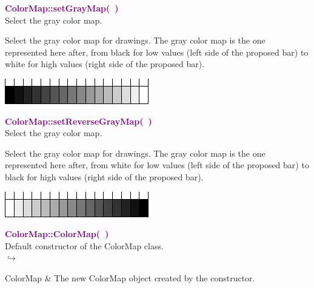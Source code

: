 \textcolor{purple}{\textbf{ColorMap::setGrayMap(~)}}\label{ColorMap::setGrayMap()}\\
Select the gray color map.

Select the gray color map for drawings.
The gray color map is the one represented here after, from black for low values (left side of the proposed bar) to white for high values (right side of the proposed bar).
\begin{center}
\includegraphics{Figures/ProgrammingLanguage/GrayMap}
\end{center}

\textcolor{purple}{\textbf{ColorMap::setReverseGrayMap(~)}}\label{ColorMap::setReverseGrayMap()}\\
Select the gray color map.

Select the gray color map for drawings.
The gray color map is the one represented here after, from white for low values (left side of the proposed bar) to black for high values (right side of the proposed bar).
\begin{center}
\includegraphics{Figures/ProgrammingLanguage/ReverseGrayMap}
\end{center}

\textcolor{purple}{\textbf{ColorMap::ColorMap(~)}}\label{ColorMap::ColorMap()}\\
Default constructor of the ColorMap class.\\ \hspace*{5mm}$\hookrightarrow$
\vspace*{-2em}\begin{tcolorbox}[grow to left by=-1cm, width=\textwidth-1cm,myArgs,tabularx={l|R}]
ColorMap & The new ColorMap object created by the constructor.
\end{tcolorbox}

